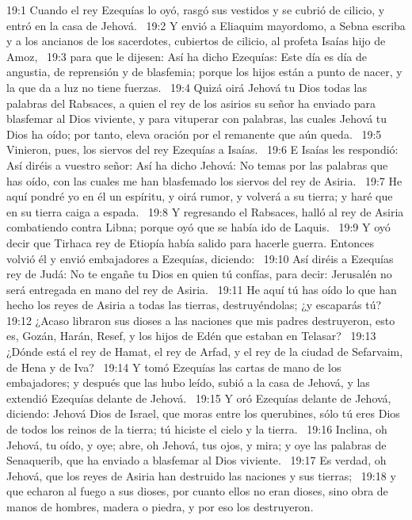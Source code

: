 19:1 Cuando el rey Ezequías lo oyó, rasgó sus vestidos y se cubrió de cilicio, y entró en la casa de Jehová.  
19:2 Y envió a Eliaquim mayordomo, a Sebna escriba y a los ancianos de los sacerdotes, cubiertos de cilicio, al profeta Isaías hijo de Amoz,  
19:3 para que le dijesen: Así ha dicho Ezequías: Este día es día de angustia, de reprensión y de blasfemia; porque los hijos están a punto de nacer, y la que da a luz no tiene fuerzas.  
19:4 Quizá oirá Jehová tu Dios todas las palabras del Rabsaces, a quien el rey de los asirios su señor ha enviado para blasfemar al Dios viviente, y para vituperar con palabras, las cuales Jehová tu Dios ha oído; por tanto, eleva oración por el remanente que aún queda.  
19:5 Vinieron, pues, los siervos del rey Ezequías a Isaías.  
19:6 E Isaías les respondió: Así diréis a vuestro señor: Así ha dicho Jehová: No temas por las palabras que has oído, con las cuales me han blasfemado los siervos del rey de Asiria.  
19:7 He aquí pondré yo en él un espíritu, y oirá rumor, y volverá a su tierra; y haré que en su tierra caiga a espada.  
19:8 Y regresando el Rabsaces, halló al rey de Asiria combatiendo contra Libna; porque oyó que se había ido de Laquis.  
19:9 Y oyó decir que Tirhaca rey de Etiopía había salido para hacerle guerra. Entonces volvió él y envió embajadores a Ezequías, diciendo:  
19:10 Así diréis a Ezequías rey de Judá: No te engañe tu Dios en quien tú confías, para decir: Jerusalén no será entregada en mano del rey de Asiria.  
19:11 He aquí tú has oído lo que han hecho los reyes de Asiria a todas las tierras, destruyéndolas; ¿y escaparás tú?  
19:12 ¿Acaso libraron sus dioses a las naciones que mis padres destruyeron, esto es, Gozán, Harán, Resef, y los hijos de Edén que estaban en Telasar?  
19:13 ¿Dónde está el rey de Hamat, el rey de Arfad, y el rey de la ciudad de Sefarvaim, de Hena y de Iva?  
19:14 Y tomó Ezequías las cartas de mano de los embajadores; y después que las hubo leído, subió a la casa de Jehová, y las extendió Ezequías delante de Jehová.  
19:15 Y oró Ezequías delante de Jehová, diciendo: Jehová Dios de Israel, que moras entre los querubines, sólo tú eres Dios de todos los reinos de la tierra; tú hiciste el cielo y la tierra.  
19:16 Inclina, oh Jehová, tu oído, y oye; abre, oh Jehová, tus ojos, y mira; y oye las palabras de Senaquerib, que ha enviado a blasfemar al Dios viviente.  
19:17 Es verdad, oh Jehová, que los reyes de Asiria han destruido las naciones y sus tierras;  
19:18 y que echaron al fuego a sus dioses, por cuanto ellos no eran dioses, sino obra de manos de hombres, madera o piedra, y por eso los destruyeron.  
